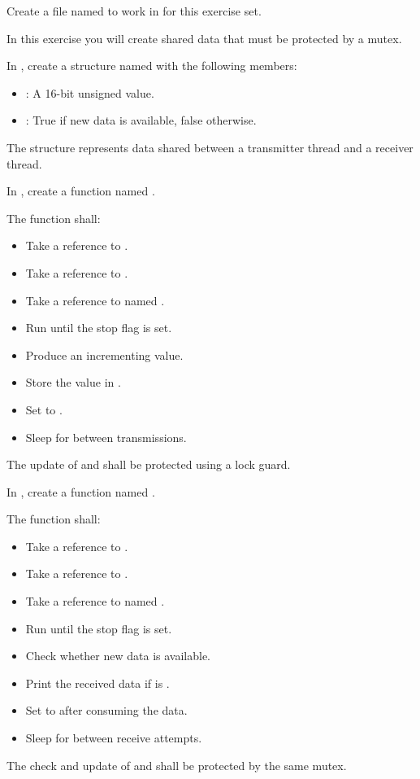 \label{c6:set:3}
Create a file named  to work in for this exercise set.

\label{c6:ex:3.1}
In this exercise you will create shared data that must be protected by a mutex.

In , create a structure named  with the following members:
\begin{itemize}
  \item {}: A 16-bit unsigned value.
  \item {}: True if new data is available, false otherwise.
\end{itemize}
The structure represents data shared between a transmitter thread and a receiver thread.

\label{c6:ex:3.2}
In , create a function named .

The function shall:
\begin{itemize}
  \item Take a reference to .
  \item Take a reference to .
  \item Take a reference to  named .
  \item Run until the stop flag is set.
  \item Produce an incrementing  value.
  \item Store the value in .
  \item Set  to .
  \item Sleep for  between transmissions.
\end{itemize}
The update of  and  shall be protected using a lock guard.

\label{c6:ex:3.3}
In , create a function named .

The function shall:
\begin{itemize}
  \item Take a reference to .
  \item Take a reference to .
  \item Take a reference to  named .
  \item Run until the stop flag is set.
  \item Check whether new data is available.
  \item Print the received data if  is .
  \item Set  to  after consuming the data.
  \item Sleep for  between receive attempts.
\end{itemize}
The check and update of  and  shall be protected by the same
mutex.

